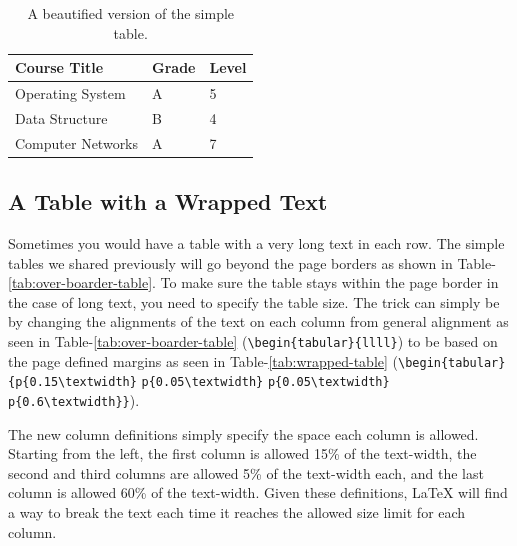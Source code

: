 \begin{table}[H]
    \centering
    \begin{tabular}{lll}
        \hline\hline
        Course Title      & Grade & Level \\ \hline\hline
        Operating System  & A     & 5     \\
        Data Structure    & B     & 4     \\
        Computer Networks & A     & 7     \\ \hline
    \end{tabular}
    \caption{A beautified version of the simple table.}
    \label{tab:simple-table-beautified}
\end{table}

\subsection{A Table with a Wrapped Text}


Sometimes you would have a table with a very long text in each row. The simple tables we shared previously will go beyond the page borders as shown in Table-\ref{tab:over-boarder-table}. To make sure the table stays within the page border in the case of long text, you need to specify the table size. The trick can simply be by changing the alignments of the text on each column from general alignment as seen in Table-\ref{tab:over-boarder-table} (\verb|\begin{tabular}|\verb|{llll}|) to be based on the page defined margins as seen in Table-\ref{tab:wrapped-table} (\verb|\begin{tabular}| \verb|{p{0.15\textwidth}| \verb|p{0.05\textwidth}| \verb|p{0.05\textwidth}| \verb|p{0.6\textwidth}}|).

The new column definitions simply specify the space each column is allowed. Starting from the left, the first column is allowed 15\% of the text-width, the second and third columns are allowed 5\% of the text-width each, and the last column is allowed 60\% of the text-width. Given these definitions, {\LaTeX} will find a way to break the text each time it reaches the allowed size limit for each column.


